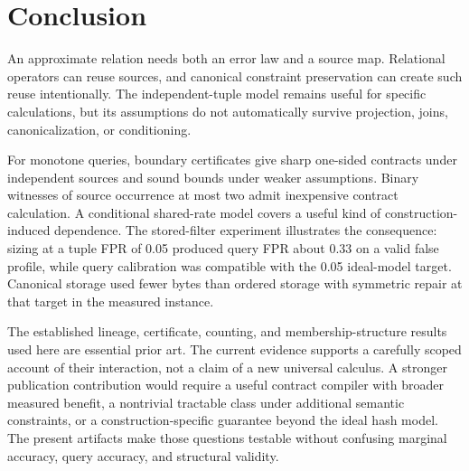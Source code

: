 \documentclass[../main.tex]{subfiles}
\begin{document}
\section{Conclusion}
\label{sec:conclusion}
An approximate relation needs both an error law and a source map. Relational
operators can reuse sources, and canonical constraint preservation can create
such reuse intentionally. The independent-tuple model remains useful for
specific calculations, but its assumptions do not automatically survive
projection, joins, canonicalization, or conditioning.

For monotone queries, boundary certificates give sharp one-sided contracts
under independent sources and sound bounds under weaker assumptions. Binary
witnesses of source occurrence at most two admit inexpensive contract
calculation. A conditional shared-rate model covers a useful kind of
construction-induced dependence. The stored-filter experiment illustrates
the consequence: sizing at a tuple FPR of 0.05 produced query FPR about 0.33
on a valid false profile, while query calibration was compatible with the
0.05 ideal-model target. Canonical storage used fewer bytes than ordered
storage with symmetric repair at that target in the measured instance.

The established lineage, certificate, counting, and membership-structure
results used here are essential prior art. The current evidence supports a
carefully scoped account of their interaction, not a claim of a new universal
calculus. A stronger publication contribution would require a useful contract
compiler with broader measured benefit, a nontrivial tractable class under
additional semantic constraints, or a construction-specific guarantee beyond
the ideal hash model. The present artifacts make those questions testable
without confusing marginal accuracy, query accuracy, and structural validity.
\end{document}
